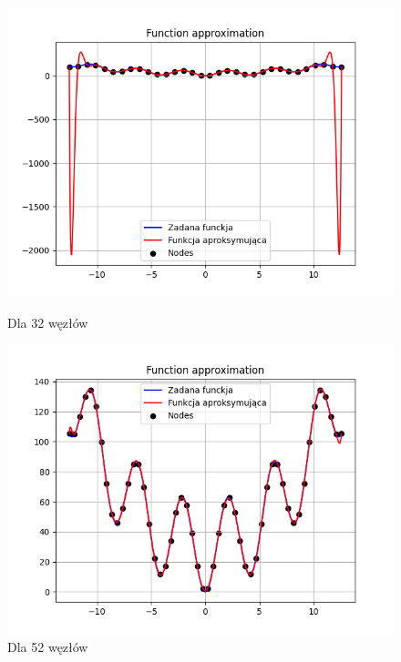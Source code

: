 \documentclass{article}
\begin{document}
\begin{figure}[H]
  \begin{minipage}[b]{0.49\textwidth}
    \begin{minipage}[b]{\textwidth}
      \includegraphics[width=\textwidth]{img38.png}
      \caption{Dla 32 węzłów}
    \end{minipage}
    \vspace*{\fill}
    \begin{minipage}[b]{\textwidth}
      \includegraphics[width=\textwidth]{img39.png}
      \caption{Dla 52 węzłów}
    \end{minipage}
  \end{minipage}
  \hfill
  \begin{minipage}[b]{0.49\textwidth}

\end{minipage}
\end{figure}
\end{document}
